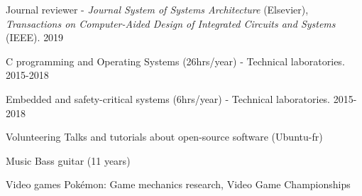 





\begin{cvhonors}
	
		
	\cvhonor
	{Journal reviewer} %
	{- \textit{Journal System of Systems Architecture} (Elsevier), \newline
	\textit{Transactions on Computer-Aided Design of Integrated Circuits and 
	Systems} (IEEE).} %
	{} %
	{2019} %
	
	
	\cvhonor
	{C programming and Operating Systems (26hrs/year)} 
	{- Technical laboratories.} %
	{} %
	{2015-2018} %
	
	
	\cvhonor
	{Embedded and safety-critical systems (6hrs/year)} %
	{- Technical laboratories.} %
	{} %
	{2015-2018} %
	
	
	
\end{cvhonors}



\begin{cvskills}


\cvskill
{Volunteering} %
{Talks and tutorials about open-source software (Ubuntu-fr)} %


\cvskill
{Music} %
{Bass guitar (11 years)} %


\cvskill
{Video games} %
{Pokémon: Game mechanics research, Video Game Championships} %

\end{cvskills}
